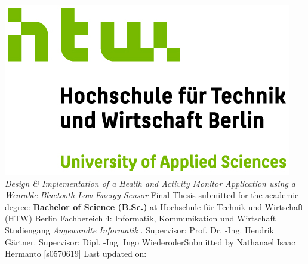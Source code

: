 \documentclass[oneside,bibliography=totocnumbered,BCOR=5mm]{scrbook}%
\begin{document}
\begin{titlepage}
\begin{center}
\includegraphics{HTW_Berlin_Logo_farbig.jpg}
\linebreak[4]
\linebreak[4]
\linebreak[4]
\linebreak[4]
\textit{\large Design \& Implementation of a Health and Activity Monitor Application using a Wearable Bluetooth Low Energy Sensor
}
\linebreak[4]
\linebreak[4]
\linebreak[4]
Final Thesis 
\linebreak[4]
\linebreak[4]
submitted for the academic degree: 
\linebreak[4]
\linebreak[4]
\textbf{Bachelor of Science (B.Sc.)}
\linebreak[4]
\linebreak[4]
at
\linebreak[4]
\linebreak[4]
Hochschule f\"ur Technik und Wirtschaft (HTW) Berlin
\linebreak[4]
Fachbereich 4: Informatik, Kommunikation und Wirtschaft
\linebreak[4]
Studiengang \textit{Angewandte Informatik}
\linebreak[4]
\linebreak[4]
. Supervisor: Prof. Dr. -Ing. Hendrik G\"artner. Supervisor: Dipl. -Ing. Ingo Wiederoder\linebreak[4]
\linebreak[4]
\linebreak[4]
\linebreak[4]
\linebreak[4]
Submitted by Nathanael Isaac Hermanto [s0570619]
\linebreak[4]
\linebreak[4]
\linebreak[4]
\linebreak[4]
Last updated on: \DTMnow

\end{center}
\end{titlepage}
\end{document}
